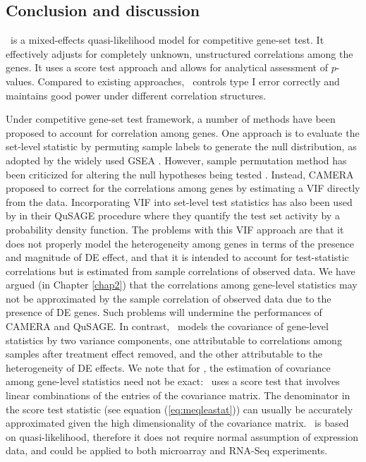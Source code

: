 	\subsection{Conclusion and discussion}\label{section:conclusion}
	
	 \OurMethod~is a mixed-effects quasi-likelihood model for competitive gene-set 
	test. It effectively adjusts for completely unknown, unstructured correlations among the genes. 
	It uses a score test approach and allows for analytical assessment of $p$-values. Compared to 
	existing approaches, \OurMethod~controls type I error correctly and maintains good power under 
	different correlation structures.  
	
	Under competitive gene-set test framework, a number of methods have been
	proposed to account for correlation among genes. One approach is to evaluate the set-level 
	statistic by permuting sample labels to generate the null distribution, as adopted by the 
	widely used GSEA \citep{subramanian2005gene}. However, sample permutation method has been 
	criticized for altering the null hypotheses being tested \citep{goeman2007analyzing, 
	khatri2012ten}. Instead, CAMERA \citep{wu2012camera} proposed to correct for the correlations 
	among genes by estimating a VIF	directly from the data. Incorporating VIF into set-level test 
	statistics has also been used by \citet{yaari2013quantitative} in their QuSAGE procedure where 
	they quantify the test set activity by a probability density function. The 
	problems with this VIF approach are that it does not properly model the heterogeneity among 
	genes in terms of the presence and magnitude of DE effect, and that it is intended to account 
	for test-statistic correlations but is estimated from sample correlations of observed data. We 
	have argued (in Chapter \ref{chap2}) that the correlations among gene-level statistics may not 
	be approximated by the sample correlation of observed data due to the presence of DE genes. 
	Such problems will 
	undermine the performances of CAMERA and QuSAGE. In contrast, \OurMethod~models the covariance 
	of gene-level statistics by two variance components, one 
	attributable to correlations among samples after treatment effect 
	removed, and the other attributable to the heterogeneity of DE effects. We note that for	
	\OurMethod, the estimation of covariance among gene-level statistics need not be exact:
	\OurMethod~uses a score test that involves linear combinations of the entries of the covariance
	matrix. The denominator in the score test statistic (see equation (\ref{eq:meqleastat})) can 
	usually be accurately approximated given the high dimensionality of the covariance matrix. 
	\OurMethod~is based on quasi-likelihood, therefore it does not require normal assumption of 
	expression data, and could be applied to both microarray and RNA-Seq experiments. 
	
